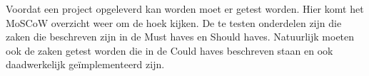 Voordat een project opgeleverd kan worden moet er getest worden. Hier komt het MoSCoW overzicht weer om de hoek kijken. De te testen onderdelen zijn die zaken die beschreven zijn in de Must haves en Should haves. Natuurlijk moeten ook de zaken getest worden die in de Could haves beschreven staan en ook daadwerkelijk ge\"implementeerd zijn.
